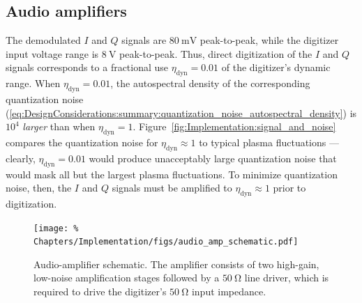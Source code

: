 \subsection{Audio amplifiers}
\label{sec:Implementation:Hardware:audio_amps}
The demodulated $I$ and $Q$ signals are $\SI{80}{\milli\volt}$ peak-to-peak,
while the digitizer input voltage range is $\SI{8}{\volt}$ peak-to-peak.
Thus, direct digitization of the $I$ and $Q$ signals
corresponds to a fractional use $\eta_{\text{dyn}} = 0.01$
of the digitizer's dynamic range.
When $\eta_{\text{dyn}} = 0.01$,
the autospectral density of the corresponding quantization noise
(\ref{eq:DesignConsiderations:summary:quantization_noise_autospectral_density})
is $10^4$ \emph{larger} than when $\eta_{\text{dyn}} = 1$.
Figure~\ref{fig:Implementation:signal_and_noise}
compares the quantization noise for $\eta_{\text{dyn}} \approx 1$
to typical plasma fluctuations
--- clearly, $\eta_{\text{dyn}} = 0.01$
would produce unacceptably large quantization noise
that would mask all but the largest plasma fluctuations.
To minimize quantization noise, then, the $I$ and $Q$ signals
must be amplified to $\eta_{\text{dyn}} \approx 1$ prior to digitization.

\begin{figure}
  \centering
  \texttt{[image: \%
    Chapters/Implementation/figs/audio\_amp\_schematic.pdf]}
  \caption[Audio-amplifier schematic]{%
    Audio-amplifier schematic.
    The amplifier consists of
    two high-gain, low-noise amplification stages
    followed by a $\SI{50}{\ohm}$ line driver,
    which is required to drive the digitizer's
    $\SI{50}{\ohm}$ input impedance.
  }
\label{fig:Implementation:audio_amplifier_schematic}
\end{figure}

